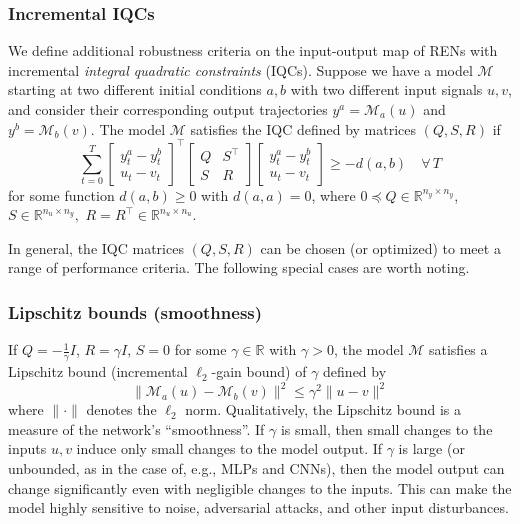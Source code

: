 \subsubsection{Incremental IQCs}

We define additional robustness criteria on the input-output map of RENs with incremental \textit{integral quadratic constraints} (IQCs). Suppose we have a model $\mathcal{M}$ starting at two different initial conditions $a,b$ with two different input signals $u, v$, and consider their corresponding output trajectories $y^a = \mathcal{M}_a(u)$ and $y^b = \mathcal{M}_b(v).$ The model $\mathcal{M}$ satisfies the IQC defined by matrices $(Q, S, R)$ if
\begin{equation}
    \sum_{t=0}^T
    \begin{bmatrix}
        y^a_t - y^b_t \\ u_t - v_t
    \end{bmatrix}^\top
    \begin{bmatrix}
        Q & S^\top \\ S & R
    \end{bmatrix}
    \begin{bmatrix}
        y^a_t - y^b_t \\ u_t - v_t
    \end{bmatrix} 
    \ge -d(a,b)
    \quad \forall \, T
\end{equation}
for some function $d(a,b) \ge 0$ with $d(a,a) = 0$, where $0 \preceq Q \in \mathbb{R}^{n_y\times n_y}$, $S\in\mathbb{R}^{n_u\times n_y},$ $R=R^\top \in \mathbb{R}^{n_u\times n_u}.$ 

In general, the IQC matrices $(Q,S,R)$ can be chosen (or optimized) to meet a range of performance criteria. The following special cases are worth noting.

\subsubsection{Lipschitz bounds (smoothness)} \label{sec:robustness-lipschitz}
If $Q = -\frac{1}{\gamma}I$, $R = \gamma I$, $S = 0$ for some $\gamma \in \mathbb{R}$ with $\gamma > 0$, the model $\mathcal{M}$ satisfies a Lipschitz bound (incremental $\ell_2$-gain bound) of $\gamma$ defined by
\begin{equation}
\|\mathcal{M}_a(u) - \mathcal{M}_b(v)\|^2 \le \gamma^2 \|u - v\|^2
\end{equation}
where $\|\cdot\|$ denotes the $\ell_2$ norm. Qualitatively, the Lipschitz bound is a measure of the network's ``smoothness''. If $\gamma$ is small, then small changes to the inputs $u,v$ induce only small changes to the model output. If $\gamma$ is large (or unbounded, as in the case of, e.g., MLPs and CNNs), then the model output can change significantly even with negligible changes to the inputs. This can make the model highly sensitive to noise, adversarial attacks, and other input disturbances.

